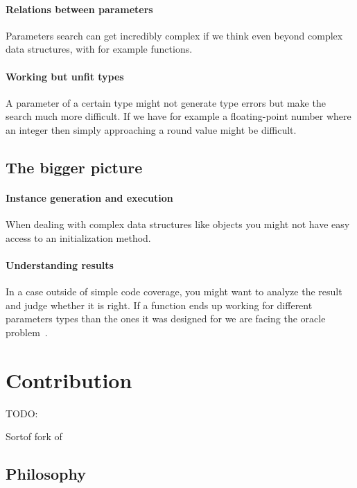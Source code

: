 \documentclass{llncs2e/llncs}
\def\todo#1{{\color{red}TODO:\quad#1}}
\begin{document}
\paragraph{Relations between parameters} Parameters search can get incredibly
complex if we think even beyond complex data structures, with for example
functions.

\paragraph{Working but unfit types} A parameter of a certain type might not
generate type errors but make the search much more difficult. If we have for
example a floating-point number where an integer then simply approaching a round
value might be difficult.

\subsection{The bigger picture}
\paragraph{Instance generation and execution} When dealing with complex data
structures like objects you might not have easy access to an initialization
method.

\paragraph{Understanding results} In a case outside of simple code coverage, you
might want to analyze the result and judge whether it is right. If a function
ends up working for different parameters types than the ones it was designed for
we are facing the oracle problem~\cite{barr2015oracle}.


\section{Contribution}
\label{contribution}
\todo{}

Sortof fork of~\cite{Kim2017ts}

\subsection{Philosophy}
\label{philosophy}
\end{document}
